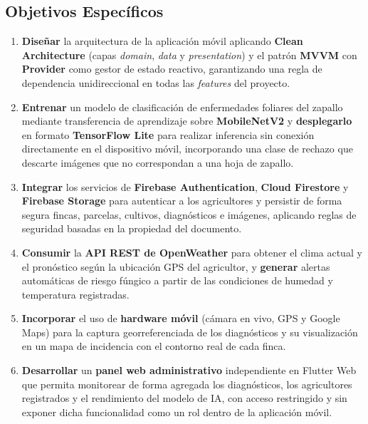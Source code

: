 \documentclass[12pt,a4paper]{article}
\begin{document}
\subsection{Objetivos Específicos}

\begin{enumerate}
  \item \textbf{Diseñar} la arquitectura de la aplicación móvil aplicando
        \textbf{Clean Architecture} (capas \textit{domain}, \textit{data} y
        \textit{presentation}) y el patrón \textbf{MVVM} con \textbf{Provider}
        como gestor de estado reactivo, garantizando una regla de dependencia
        unidireccional en todas las \textit{features} del proyecto.

  \item \textbf{Entrenar} un modelo de clasificación de enfermedades foliares
        del zapallo mediante transferencia de aprendizaje sobre
        \textbf{MobileNetV2} y \textbf{desplegarlo} en formato \textbf{TensorFlow
        Lite} para realizar inferencia sin conexión directamente en el
        dispositivo móvil, incorporando una clase de rechazo que descarte
        imágenes que no correspondan a una hoja de zapallo.

  \item \textbf{Integrar} los servicios de \textbf{Firebase Authentication},
        \textbf{Cloud Firestore} y \textbf{Firebase Storage} para autenticar a
        los agricultores y persistir de forma segura fincas, parcelas, cultivos,
        diagnósticos e imágenes, aplicando reglas de seguridad basadas en la
        propiedad del documento.

  \item \textbf{Consumir} la \textbf{API REST de OpenWeather} para obtener el
        clima actual y el pronóstico según la ubicación GPS del agricultor, y
        \textbf{generar} alertas automáticas de riesgo fúngico a partir de las
        condiciones de humedad y temperatura registradas.

  \item \textbf{Incorporar} el uso de \textbf{hardware móvil} (cámara en vivo,
        GPS y Google Maps) para la captura georreferenciada de los diagnósticos y
        su visualización en un mapa de incidencia con el contorno real de cada
        finca.

  \item \textbf{Desarrollar} un \textbf{panel web administrativo} independiente
        en Flutter Web que permita monitorear de forma agregada los diagnósticos,
        los agricultores registrados y el rendimiento del modelo de IA, con acceso
        restringido y sin exponer dicha funcionalidad como un rol dentro de la
        aplicación móvil.


\end{enumerate}
\end{document}
